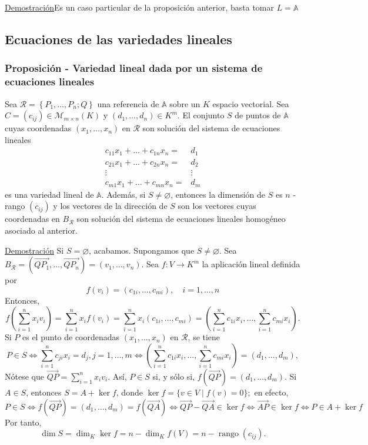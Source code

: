\documentclass[12pt, a4paper, ones, notitlepage, openany,titlepage]{article}
\newcommand{\demostracion}{\noindent\underline{Demostración}}
\begin{document}
\demostracion Es un caso particular de la proposición anterior, basta tomar $L=\mathbb{A}$

\subsection{Ecuaciones de las variedades lineales}

\subsubsection{Proposición - Variedad lineal dada por un sistema de ecuaciones lineales}
Sea $\mathcal{R}=\left\{P_{1}, \ldots, P_{n} ; Q\right\}$ una referencia de $\mathbb{A}$ sobre un $K$ espacio vectorial. Sea $C = (c_{ij}) \in \mathcal{M}_{m \times n}(K)$ y $(d_1,\ldots,d_n) \in K^m$. El conjunto $S$ de puntos de $\mathbb{A}$ cuyas coordenadas $\left(x_{1}, \ldots, x_{n}\right)$ en $\mathcal{R}$ son solución del sistema de ecuaciones lineales
$$
\begin{aligned}
c_{11} x_{1}+\ldots+c_{1 n} x_{n}= & d_{1} \\
c_{21} x_{1}+\ldots+c_{2 n} x_{n}= & d_{2} \\
\vdots & \vdots \\
c_{m 1} x_{1}+\ldots+c_{m n} x_{n}= & d_{m}
\end{aligned}
$$
es una variedad lineal de $\mathbb{A}$. Además, si $S \neq \varnothing$, entonces la dimensión de $S$ es $n$ - rango $\left(c_{i j}\right)$ y los vectores de la dirección de $S$ son los vectores cuyas coordenadas en $B_{\mathcal{R}}$ son solución del sistema de ecuaciones lineales homogéneo asociado al anterior.

\demostracion
\noindent Si $S = \varnothing$, acabamos. Supongamos que $S \neq \varnothing$. Sea $B_\mathcal{R} = \left(\overrightarrow{QP_1},\ldots,\overrightarrow{QP_n}\right) = (v_1,\ldots,v_n)$. Sea $f: V \rightarrow K^{m}$ la aplicación lineal definida por
$$
f\left(v_{i}\right)=\left(c_{1 i}, \ldots, c_{m i}\right), \quad i=1, \ldots, n
$$
Entonces,
$$
f\left(\sum_{i=1}^{n} x_{i} v_{i}\right)=\sum_{i=1}^{n}x_if(v_i)=\sum_{i=1}^{n}x_i(c_{1i},\ldots,c_{mi})=\left(\sum_{i=1}^{n} c_{1 i} x_{i}, \ldots, \sum_{i=1}^{n} c_{m i} x_{i}\right) .
$$
Si $P$ es el punto de coordenadas $\left(x_{1}, \ldots, x_{n}\right)$ en $\mathcal{R}$, se tiene
$$
P \in S \Longleftrightarrow \sum_{i=1}^{n} c_{j i} x_{i}=d_{j}, j=1, \ldots, m \Longleftrightarrow\left(\sum_{i=1}^{n} c_{1 i} x_{i}, \ldots, \sum_{i=1}^{n} c_{m i} x_{i}\right)=\left(d_{1}, \ldots, d_{m}\right),
$$
Nótese que $\displaystyle \overrightarrow{QP} = \sum_{i=1}^{n} x_i v_i$. Así, $P \in S$ si, y sólo si, $f(\overrightarrow{Q P})=\left(d_{1}, \ldots, d_{m}\right)$. Si $A \in S$, entonces $S=A+\ker f$, donde $\ker f=\{v \in V \mid f(v)=0\} ;$ en efecto,
$$
P \in S \Longleftrightarrow f(\overrightarrow{Q P})=\left(d_{1}, \ldots, d_{m}\right)=f(\overrightarrow{Q A}) \Longleftrightarrow \overrightarrow{Q P}-\overrightarrow{Q A} \in \ker f \Longleftrightarrow \overrightarrow{A P} \in \ker f \Longleftrightarrow P \in A+\ker f
$$
Por tanto,
$$
\dim  S=\dim _{K} \ker f=n-\dim _{K} f(V)=n-\operatorname{rango}\left(c_{i j}\right) .
$$
\end{document}
